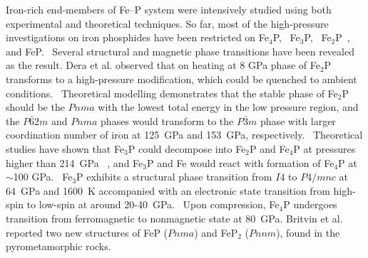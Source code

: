 \documentclass[twoside,twocolumn,9pt]{article}
\begin{document}
Iron-rich end-members of Fe--P system were intensively studied using both experimental and theoretical techniques. 
So far, most of the high-pressure investigations on iron phosphides have been restricted on Fe$_4$P,~\cite{Wu-2011-GRL} Fe$_3$P,~\cite{Scott-2007-GRL} Fe$_2$P~\cite{Dera-2008-GRL, Wu_2010-JPCM}, and FeP.~\cite{Gu-2011-FeP-EPS}
Several structural and magnetic phase transitions have been revealed as the result. 
Dera et al. observed that on heating at 8 GPa phase of Fe$_2$P transforms to a high-pressure modification, which could be quenched to ambient conditions.~\cite{Dera-2008-GRL} 
Theoretical modelling demonstrates that the stable phase of Fe$_2$P should be the $Pnma$ with the lowest total energy in the low pressure region, and the $P\bar{6}2m$ and $Pnma$ phases would transform to the $P\bar{3}m$ phase with larger coordination number of iron at 125~GPa and 153~GPa, respectively.~\cite{Wu_2010-JPCM} 
Theoretical studies have shown that Fe$_3$P could decompose into Fe$_2$P and Fe$_4$P at pressures higher than 214~GPa ~\cite{Zhao-2017-RSC-Adv}, and Fe$_3$P and Fe would react with formation of Fe$_4$P at $\sim$100 GPa.~\cite{Wu-2011-GRL} 
Fe$_3$P exhibits a structural phase transition from $I4$ to $P4/mnc$ at 64~GPa and 1600~K accompanied with an electronic state transition from high-spin to low-spin at around 20-40~GPa.~\cite{GU2014-EPSL, Gu-2016-AmMiner-Fe3P}
Upon compression, Fe$_4$P undergoes transition from ferromagnetic to nonmagnetic state at 80~GPa.\cite{Wu-2011-GRL}
Britvin et al. reported two new structures of FeP ($Pnma$) and FeP$_2$ ($Pnnm$), found in the pyrometamorphic rocks.  \cite {Britvin2019-PCM-Fe2P,Britvin2019-murashkoite-MP-FeP}
\end{document}

